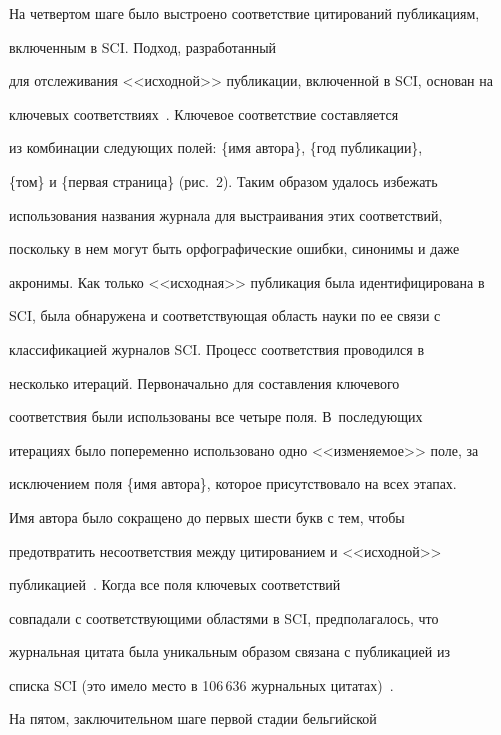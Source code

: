 На четвертом шаге было выстроено соответствие цитирований публикациям, 


включенным в SCI. Подход, разработанный 


для отслеживания <<исходной>> пуб\-ли\-ка\-ции, включенной в SCI, основан на 


ключевых соответствиях~\cite{23-koz}. Ключевое соответствие составляется 


из комбинации следующих полей: \{имя автора\}, \{год публикации\}, 


\{том\} и \{первая страница\} (рис.~2). Таким образом удалось избежать 


использования названия журнала для выстраивания этих соответствий, 


поскольку в нем могут быть орфографические ошибки, синонимы и даже 


акронимы. Как только <<исходная>> публикация была идентифицирована в 


SCI, была обнаружена и соответствующая область науки по ее связи с 


классификацией журналов SCI. Процесс соответствия проводился в 


несколько итераций. Первоначально для составления ключевого 


соответствия были использованы все четыре поля. В~последующих 


итерациях было попеременно использовано одно <<изменяемое>> поле, за 


исключением поля \{имя автора\}, которое присутствовало на всех этапах. 


Имя автора было сокращено до первых шести букв с тем, чтобы 


пред\-от\-вра\-тить несоответствия между цитированием и <<исходной>> 


публикацией~\cite{23-koz}. Когда все поля ключевых соответствий 


совпадали с соответствующими областями в SCI, предполагалось, что 


журнальная цитата была уникальным образом связана с публикацией из 


списка SCI (это имело место в 106\,636 журнальных цитатах)~\cite{2-koz}.











     На пятом, заключительном шаге первой стадии бельгийской 


